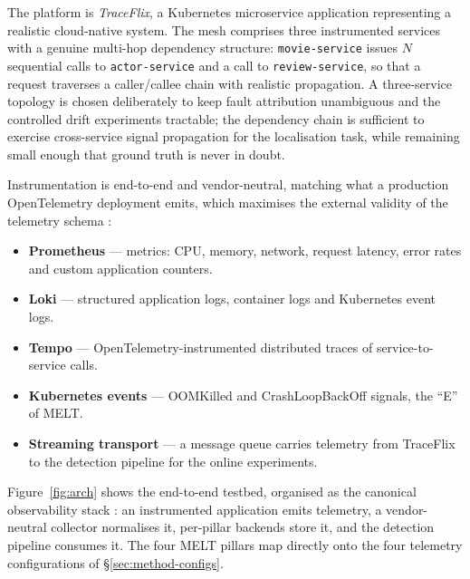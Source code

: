 \documentclass[acmsmall]{acmart}
\begin{document}
The platform is \emph{TraceFlix}, a Kubernetes microservice application representing a realistic cloud-native system. The mesh comprises three instrumented services with a genuine multi-hop dependency structure: \texttt{movie-service} issues $N$ sequential calls to \texttt{actor-service} and a call to \texttt{review-service}, so that a request traverses a caller/callee chain with realistic propagation. A three-service topology is chosen deliberately to keep fault attribution unambiguous and the controlled drift experiments tractable; the dependency chain is sufficient to exercise cross-service signal propagation for the localisation task, while remaining small enough that ground truth is never in doubt.

Instrumentation is end-to-end and vendor-neutral, matching what a production OpenTelemetry deployment emits, which maximises the external validity of the telemetry schema \cite{boten2022,hrusto2026}:
\begin{itemize}
  \item \textbf{Prometheus} --- metrics: CPU, memory, network, request latency, error rates and custom application counters.
  \item \textbf{Loki} --- structured application logs, container logs and Kubernetes event logs.
  \item \textbf{Tempo} --- OpenTelemetry-instrumented distributed traces of service-to-service calls.
  \item \textbf{Kubernetes events} --- OOMKilled and CrashLoopBackOff signals, the ``E'' of MELT.
  \item \textbf{Streaming transport} --- a message queue carries telemetry from TraceFlix to the detection pipeline for the online experiments.
\end{itemize}

Figure~\ref{fig:arch} shows the end-to-end testbed, organised as the canonical
observability stack \cite{kosinska2023}: an instrumented application emits
telemetry, a vendor-neutral collector normalises it, per-pillar backends store it,
and the detection pipeline consumes it. The four MELT pillars map directly onto the
four telemetry configurations of \S\ref{sec:method-configs}.
\end{document}
